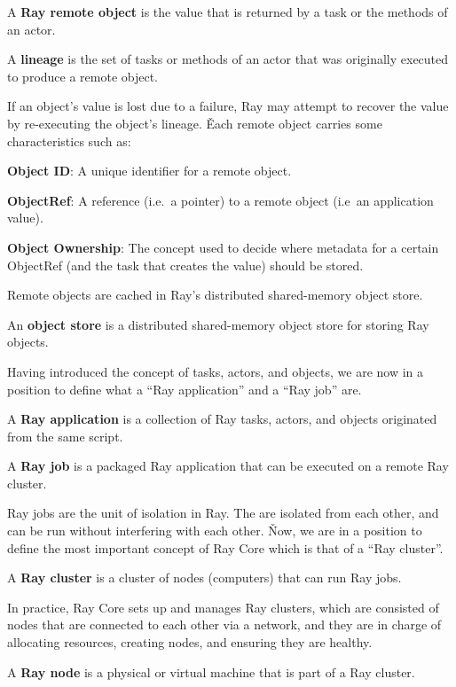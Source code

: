 A \textbf{Ray remote object} is the value that is returned by a task or the methods of an actor.
\ed

\bd[Lineage]
A \textbf{lineage} is the set of tasks or methods of an actor that was originally executed to produce a remote object.
\ed

If an object's value is lost due to a failure, Ray may attempt to recover the value by re-executing the object's
lineage. \v

Each remote object carries some characteristics such as:
\bit
\item \textbf{Object ID}: A unique identifier for a remote object.
\item \textbf{ObjectRef}: A reference (i.e.\ a pointer) to a remote object (i.e\ an application value).
\item \textbf{Object Ownership}: The concept used to decide where metadata for a certain ObjectRef (and the task that
creates the value) should be stored.
\eit

Remote objects are cached in Ray's distributed shared-memory object store.

An \textbf{object store} is a distributed shared-memory object store for storing Ray objects.
\ed

Having introduced the concept of tasks, actors, and objects, we are now in a position to define what a ``Ray
application'' and a ``Ray job'' are.

A \textbf{Ray application} is a collection of Ray tasks, actors, and objects originated from the same script.
\ed

A \textbf{Ray job} is a packaged Ray application that can be executed on a remote Ray cluster.
\ed

Ray jobs are the unit of isolation in Ray. The are isolated from each other, and can be run without interfering with
each other. \v

Now, we are in a position to define the most important concept of Ray Core which is that of a ``Ray cluster''.

A \textbf{Ray cluster} is a cluster of nodes (computers) that can run Ray jobs.
\ed

In practice, Ray Core sets up and manages Ray clusters, which are consisted of nodes that are connected to each other
via a network, and they are in charge of allocating resources, creating nodes, and ensuring they are healthy.

A \textbf{Ray node} is a physical or virtual machine that is part of a Ray cluster.
\ed

